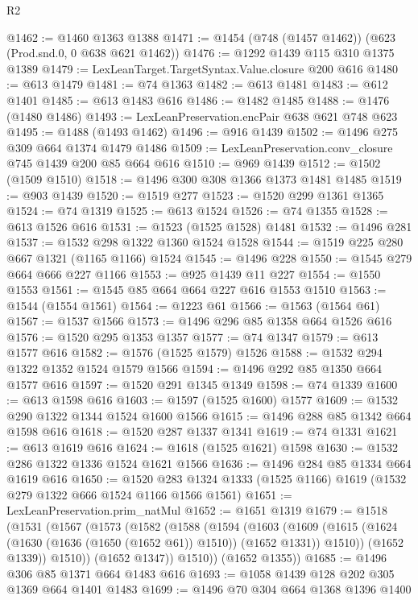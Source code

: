 \begin{lexlean}{R2}
\begin{coremodule}
@1462 := @1460 @1363 @1388
@1471 := @1454 (@748 (@1457 @1462)) (@623 (Prod.snd.{0, 0} @638 @621 @1462))
@1476 := @1292 @1439 @115 @310 @1375 @1389
@1479 := LexLeanTarget.TargetSyntax.Value.closure @200 @616
@1480 := @613 @1479
@1481 := @74 @1363
@1482 := @613 @1481
@1483 := @612 @1401
@1485 := @613 @1483 @616
@1486 := @1482 @1485
@1488 := @1476 (@1480 @1486)
@1493 := LexLeanPreservation.encPair @638 @621 @748 @623
@1495 := @1488 (@1493 @1462)
@1496 := @916 @1439
@1502 := @1496 @275 @309 @664 @1374 @1479 @1486
@1509 := LexLeanPreservation.conv_closure @745 @1439 @200 @85 @664 @616
@1510 := @969 @1439
@1512 := @1502 (@1509 @1510)
@1518 := @1496 @300 @308 @1366 @1373 @1481 @1485
@1519 := @903 @1439
@1520 := @1519 @277
@1523 := @1520 @299 @1361 @1365
@1524 := @74 @1319
@1525 := @613 @1524
@1526 := @74 @1355
@1528 := @613 @1526 @616
@1531 := @1523 (@1525 @1528) @1481
@1532 := @1496 @281
@1537 := @1532 @298 @1322 @1360 @1524 @1528
@1544 := @1519 @225 @280 @667 @1321 (@1165 @1166) @1524
@1545 := @1496 @228
@1550 := @1545 @279 @664 @666 @227 @1166
@1553 := @925 @1439 @11 @227
@1554 := @1550 @1553
@1561 := @1545 @85 @664 @664 @227 @616 @1553 @1510
@1563 := @1544 (@1554 @1561)
@1564 := @1223 @61
@1566 := @1563 (@1564 @61)
@1567 := @1537 @1566
@1573 := @1496 @296 @85 @1358 @664 @1526 @616
@1576 := @1520 @295 @1353 @1357
@1577 := @74 @1347
@1579 := @613 @1577 @616
@1582 := @1576 (@1525 @1579) @1526
@1588 := @1532 @294 @1322 @1352 @1524 @1579 @1566
@1594 := @1496 @292 @85 @1350 @664 @1577 @616
@1597 := @1520 @291 @1345 @1349
@1598 := @74 @1339
@1600 := @613 @1598 @616
@1603 := @1597 (@1525 @1600) @1577
@1609 := @1532 @290 @1322 @1344 @1524 @1600 @1566
@1615 := @1496 @288 @85 @1342 @664 @1598 @616
@1618 := @1520 @287 @1337 @1341
@1619 := @74 @1331
@1621 := @613 @1619 @616
@1624 := @1618 (@1525 @1621) @1598
@1630 := @1532 @286 @1322 @1336 @1524 @1621 @1566
@1636 := @1496 @284 @85 @1334 @664 @1619 @616
@1650 := @1520 @283 @1324 @1333 (@1525 @1166) @1619 (@1532 @279 @1322 @666 @1524 @1166 @1566 @1561)
@1651 := LexLeanPreservation.prim_natMul
@1652 := @1651 @1319
@1679 := @1518
    (@1531
      (@1567
        (@1573
          (@1582
            (@1588
              (@1594
                (@1603
                  (@1609
                    (@1615 (@1624 (@1630 (@1636 (@1650 (@1652 @61)) @1510)) (@1652 @1331)) @1510))
                  (@1652 @1339))
                @1510))
            (@1652 @1347))
          @1510))
      (@1652 @1355))
@1685 := @1496 @306 @85 @1371 @664 @1483 @616
@1693 := @1058 @1439 @128 @202 @305 @1369 @664 @1401 @1483
@1699 := @1496 @70 @304 @664 @1368 @1396 @1400

\end{coremodule}
\end{lexlean}
